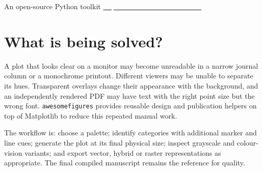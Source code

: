 \documentclass[10pt,twocolumn,a4paper]{article}
\begin{document}
\begin{titlepage}
\noindent
{\sffamily\footnotesize\textcolor{CoverMuted}{
 An open-source Python toolkit \quad
 \href{https://heri-espino.github.io/Colors/studio.html}
 {\textcolor{white}{Explore Palette \& Plot Studio\ \(\rightarrow\)}}}
}
\end{titlepage}
\nopagecolor
\color{black}
\twocolumn
\setcounter{page}{1}

\begin{abstract}
This two-column article is a reproducible technical presentation of
\texttt{awesomefigures}, a Python library for scientific palette design,
publication-sized figures and accessible visual identifiers. We show
how hue, chroma and relative luminance are chosen; how categorical
graphics can be inspected in grayscale and simulated colour-vision
conditions; how transparent observations interact with backgrounds;
and how a local LaTeX installation supplies document dimensions
and fonts. We compare true-vector PDF/PGF output with intentional
hybrid vector--raster export and construct both a full-page and a
landscape accessibility dashboard. The interactive Palette \& Plot
Studio offers a browser-based path to many of the same choices.
Every result is generated by the associated reproducible script.
\end{abstract}

\section{What is being solved?}
A plot that looks clear on a monitor may become unreadable in a
narrow journal column or a monochrome printout. Different viewers
may be unable to separate its hues. Transparent overlays change
their appearance with the background, and an independently rendered
PDF may have text with the right point size but the wrong font.
\texttt{awesomefigures} provides reusable design and publication
helpers on top of Matplotlib to reduce this repeated manual work.

The workflow is: choose a palette; identify categories with
additional marker and line cues; generate the plot at its final
physical size; inspect grayscale and colour-vision variants;
and export vector, hybrid or raster representations as appropriate.
The final compiled manuscript remains the reference for quality.
\end{document}
